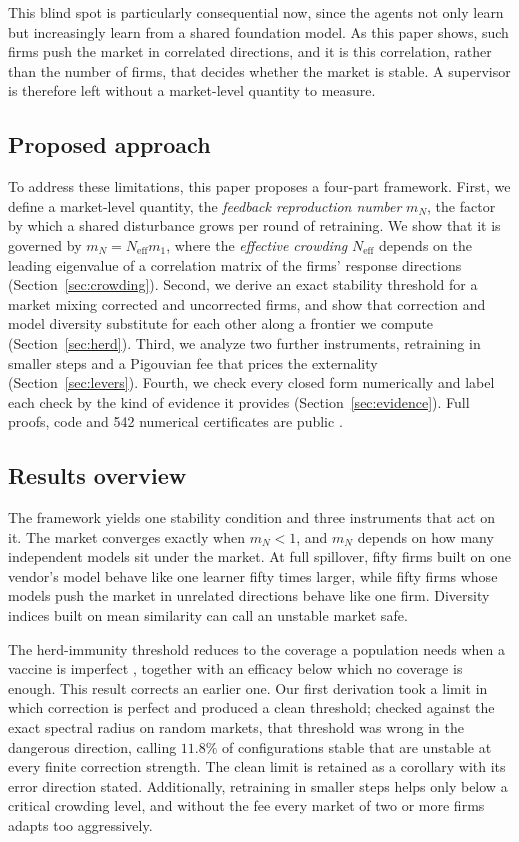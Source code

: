 \documentclass[conference]{IEEEtran}
\theoremstyle{plain}
\newcommand{\Neff}{N_{\mathrm{eff}}}
\newcommand{\mN}{m_N}
\begin{document}
This blind spot is particularly consequential now, since the agents not only learn but increasingly learn from a shared foundation model. As this paper shows, such firms push the market in correlated directions, and it is this correlation, rather than the number of firms, that decides whether the market is stable. A supervisor is therefore left without a market-level quantity to measure.

\subsection{Proposed approach}
To address these limitations, this paper proposes a four-part framework. First, we define a market-level quantity, the \emph{feedback reproduction number} $\mN$, the factor by which a shared disturbance grows per round of retraining. We show that it is governed by $\mN=\Neff m_1$, where the \emph{effective crowding} $\Neff$ depends on the leading eigenvalue of a correlation matrix of the firms' response directions (Section~\ref{sec:crowding}). Second, we derive an exact stability threshold for a market mixing corrected and uncorrected firms, and show that correction and model diversity substitute for each other along a frontier we compute (Section~\ref{sec:herd}). Third, we analyze two further instruments, retraining in smaller steps and a Pigouvian fee that prices the externality (Section~\ref{sec:levers}). Fourth, we check every closed form numerically and label each check by the kind of evidence it provides (Section~\ref{sec:evidence}). Full proofs, code and 542 numerical certificates are public \cite{price2026}.

\subsection{Results overview}
The framework yields one stability condition and three instruments that act on it. The market converges exactly when $\mN<1$, and $\mN$ depends on how many independent models sit under the market. At full spillover, fifty firms built on one vendor's model behave like one learner fifty times larger, while fifty firms whose models push the market in unrelated directions behave like one firm. Diversity indices built on mean similarity can call an unstable market safe.

The herd-immunity threshold reduces to the coverage a population needs when a vaccine is imperfect \cite{anderson1985,fine2011}, together with an efficacy below which no coverage is enough. This result corrects an earlier one. Our first derivation took a limit in which correction is perfect and produced a clean threshold; checked against the exact spectral radius on random markets, that threshold was wrong in the dangerous direction, calling $11.8\%$ of configurations stable that are unstable at every finite correction strength. The clean limit is retained as a corollary with its error direction stated. Additionally, retraining in smaller steps helps only below a critical crowding level, and without the fee every market of two or more firms adapts too aggressively.
\end{document}
